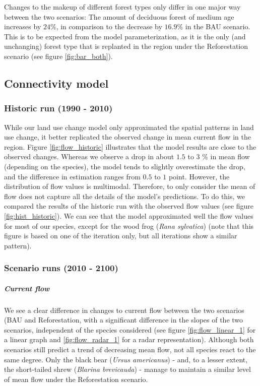 Changes to the makeup of different forest types only differ in one major way between the two scenarios: The amount of deciduous forest of medium age increases by $24\%$, in comparison to the decrease by $16.9\%$ in the BAU scenario. This is to be expected from the model parameterization, as it is the only (and unchanging) forest type that is replanted in the region under the Reforestation scenario (see figure \ref{fig:bar_both}). \\

\subsection{Connectivity model}

\subsubsection*{Historic run (1990 - 2010)}

While our land use change model only approximated the spatial patterns in land use change, it better replicated the observed change in mean current flow in the region. Figure \ref{fig:flow_historic} illustrates that the model results are close to the observed changes. Whereas we observe a drop in about $1.5$ to $3$ \% in mean flow (depending on the species), the model tends to slightly overestimate the drop, and the difference in estimation ranges from $0.5$ to $1$ point. However, the distribution of flow values is multimodal. Therefore, to only consider the mean of flow does not capture all the details of the model’s predictions. To do this, we compared the results of the historic run with the observed flow values (see figure \ref{fig:hist_historic}). We can see that the model approximated well the flow values for most of our species, except for the wood frog (\textit{Rana sylvatica}) (note that this figure is based on one of the iteration only, but all iterations show a similar pattern). \\

\subsubsection*{Scenario runs (2010 - 2100)}

\vspace{1em}

\subparagraph*{\textit{Current flow}} We see a clear difference in changes to current flow between the two scenarios (BAU and Reforestation, with a significant difference in the slopes of the two scenarios, independent of the species considered (see figure \ref{fig:flow_linear_1} for a linear graph and \ref{fig:flow_radar_1} for a radar representation). Although both scenarios still predict a trend of decreasing mean flow, not all species react to the same degree. Only the black bear (\textit{Ursus americanus}) - and, to a lesser extent, the short-tailed shrew (\textit{Blarina brevicauda}) - manage to maintain a similar level of mean flow under the Reforestation scenario.

